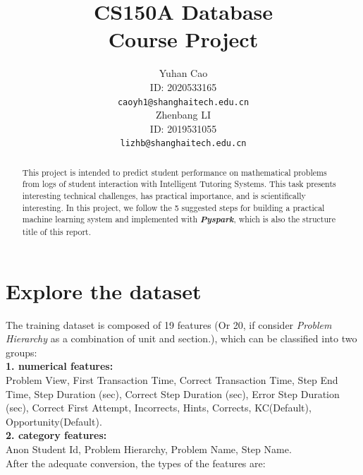 \documentclass{article}
\title{CS150A Database \\Course Project}
\author{
  Yuhan Cao\\
  ID: 2020533165\\
  \texttt{caoyh1@shanghaitech.edu.cn} \\
   \And
  Zhenbang LI\\
  ID: 2019531055\\
  \texttt{lizhb@shanghaitech.edu.cn}
}
\begin{document}

\maketitle

\begin{abstract}
This project is intended to predict student performance on mathematical problems from logs of
student interaction with Intelligent Tutoring Systems. This task presents interesting technical
challenges, has practical importance, and is scientifically interesting. In this project, we follow the 5 suggested steps for building a practical machine learning system and implemented with \textbf{\textit{Pyspark}}, which is also the structure title of this report.
\end{abstract}

\section{Explore the dataset}
The training dataset is composed of 19 features (Or 20, if consider\textit{ Problem Hierarchy} as a combination of unit and section.), which can be classified into two groups: \\
\textbf{1. numerical features:}\\
Problem View, First Transaction Time, Correct Transaction Time, Step End Time, Step Duration (sec), Correct Step Duration (sec), Error Step Duration (sec), Correct First Attempt, Incorrects, Hints, Corrects, KC(Default), Opportunity(Default).	\\
\textbf{2. category features:}\\
Anon Student Id, Problem Hierarchy, Problem Name, Step Name.\\
After the adequate conversion, the types of the features are:
\end{document}
